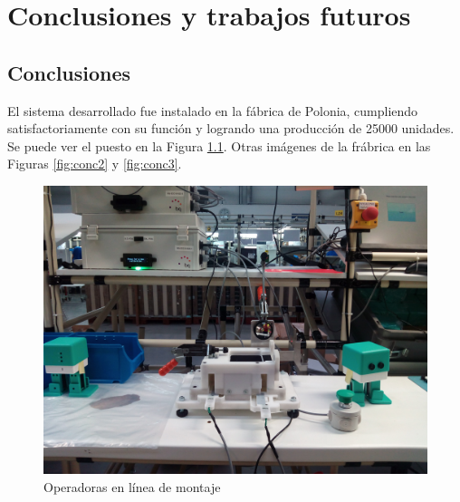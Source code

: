 
\chapter{Conclusiones y trabajos futuros} %

\label{Chapter4} %


\section{Conclusiones}

El sistema desarrollado fue instalado en la fábrica de Polonia, cumpliendo satisfactoriamente con su función y logrando una producción de 25000 unidades. Se puede ver el puesto en la Figura \ref{fig:conc1}. Otras imágenes de la frábrica en las Figuras \ref{fig:conc2} y \ref{fig:conc3}.

\begin{figure}[h]
\centering
\includegraphics[width=135mm]{Figures/conc1.jpg}
\caption[Puesto de calibración en la línea de montaje]{Operadoras en línea de montaje}
\label{fig:conc1}
\end{figure}

